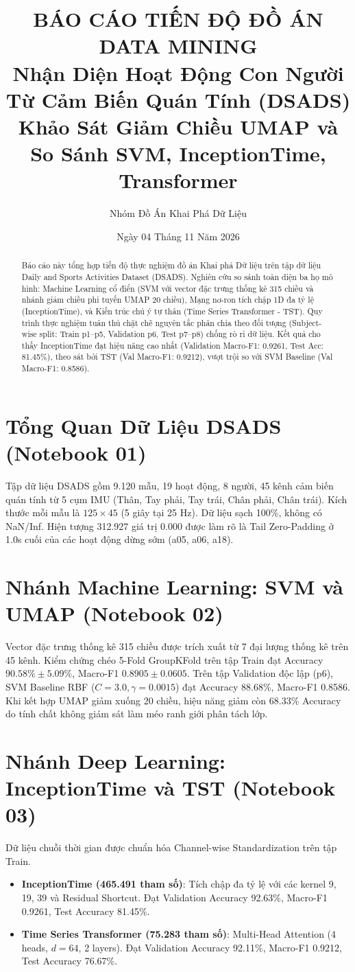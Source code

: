 \documentclass[12pt,a4paper]{article}
\title{\textbf{BÁO CÁO TIẾN ĐỘ ĐỒ ÁN DATA MINING}\\
\large Nhận Diện Hoạt Động Con Người Từ Cảm Biến Quán Tính (DSADS)\\
Khảo Sát Giảm Chiều UMAP và So Sánh SVM, InceptionTime, Transformer}
\author{Nhóm Đồ Án Khai Phá Dữ Liệu}
\date{Ngày 04 Tháng 11 Năm 2026}
\begin{document}
\maketitle

\begin{abstract}
Báo cáo này tổng hợp tiến độ thực nghiệm đồ án Khai phá Dữ liệu trên tập dữ liệu Daily and Sports Activities Dataset (DSADS). Nghiên cứu so sánh toàn diện ba họ mô hình: Machine Learning cổ điển (SVM với vector đặc trưng thống kê 315 chiều và nhánh giảm chiều phi tuyến UMAP 20 chiều), Mạng nơ-ron tích chập 1D đa tỷ lệ (InceptionTime), và Kiến trúc chú ý tự thân (Time Series Transformer - TST). Quy trình thực nghiệm tuân thủ chặt chẽ nguyên tắc phân chia theo đối tượng (Subject-wise split: Train p1--p5, Validation p6, Test p7--p8) chống rò rỉ dữ liệu. Kết quả cho thấy InceptionTime đạt hiệu năng cao nhất (Validation Macro-F1: 0.9261, Test Acc: 81.45\%), theo sát bởi TST (Val Macro-F1: 0.9212), vượt trội so với SVM Baseline (Val Macro-F1: 0.8586).
\end{abstract}

\section{Tổng Quan Dữ Liệu DSADS (Notebook 01)}
Tập dữ liệu DSADS gồm 9.120 mẫu, 19 hoạt động, 8 người, 45 kênh cảm biến quán tính từ 5 cụm IMU (Thân, Tay phải, Tay trái, Chân phải, Chân trái). Kích thước mỗi mẫu là $125 \times 45$ (5 giây tại 25 Hz). Dữ liệu sạch 100\%, không có NaN/Inf. Hiện tượng 312.927 giá trị 0.000 được làm rõ là Tail Zero-Padding ở 1.0s cuối của các hoạt động dừng sớm (a05, a06, a18).

\section{Nhánh Machine Learning: SVM và UMAP (Notebook 02)}
Vector đặc trưng thống kê 315 chiều được trích xuất từ 7 đại lượng thống kê trên 45 kênh. Kiểm chứng chéo 5-Fold GroupKFold trên tập Train đạt Accuracy $90.58\% \pm 5.09\%$, Macro-F1 $0.8905 \pm 0.0605$.
Trên tập Validation độc lập (p6), SVM Baseline RBF ($C=3.0, \gamma=0.0015$) đạt Accuracy 88.68\%, Macro-F1 0.8586. Khi kết hợp UMAP giảm xuống 20 chiều, hiệu năng giảm còn 68.33\% Accuracy do tính chất không giám sát làm méo ranh giới phân tách lớp.

\section{Nhánh Deep Learning: InceptionTime và TST (Notebook 03)}
Dữ liệu chuỗi thời gian được chuẩn hóa Channel-wise Standardization trên tập Train.
\begin{itemize}
    \item \textbf{InceptionTime (465.491 tham số)}: Tích chập đa tỷ lệ với các kernel 9, 19, 39 và Residual Shortcut. Đạt Validation Accuracy 92.63\%, Macro-F1 0.9261, Test Accuracy 81.45\%.
    \item \textbf{Time Series Transformer (75.283 tham số)}: Multi-Head Attention (4 heads, $d=64$, 2 layers). Đạt Validation Accuracy 92.11\%, Macro-F1 0.9212, Test Accuracy 76.67\%.
\end{itemize}
\end{document}
